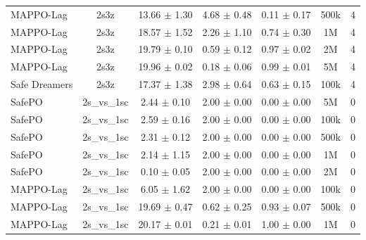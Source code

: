 \begin{longtable}{lcccccc}
MAPPO-Lag & 2s3z & \textcolor{green!60!black}{13.66 $\pm$ 1.30} & \textcolor{green!60!black}{4.68 $\pm$ 0.48} & \textcolor{green!60!black}{0.11 $\pm$ 0.17} & 500k & 4 \\
MAPPO-Lag & 2s3z & \textcolor{red!70!black}{18.57 $\pm$ 1.52} & \textcolor{red!70!black}{2.26 $\pm$ 1.10} & \textcolor{red!70!black}{0.74 $\pm$ 0.30} & 1M & 4 \\
MAPPO-Lag & 2s3z & \textcolor{red!70!black}{19.79 $\pm$ 0.10} & \textcolor{red!70!black}{0.59 $\pm$ 0.12} & \textcolor{red!70!black}{0.97 $\pm$ 0.02} & 2M & 4 \\
MAPPO-Lag & 2s3z & \textcolor{red!70!black}{19.96 $\pm$ 0.02} & \textcolor{red!70!black}{0.18 $\pm$ 0.06} & \textcolor{red!70!black}{0.99 $\pm$ 0.01} & 5M & 4 \\
Safe Dreamers & 2s3z & 17.37 $\pm$ 1.38 & 2.98 $\pm$ 0.64 & 0.63 $\pm$ 0.15 & 100k & 4 \\
\midrule
SafePO & 2s\_vs\_1sc & \textcolor{green!60!black}{2.44 $\pm$ 0.10} & \textcolor{green!60!black}{2.00 $\pm$ 0.00} & \textcolor{green!60!black}{0.00 $\pm$ 0.00} & 5M & 0 \\
SafePO & 2s\_vs\_1sc & \textcolor{green!60!black}{2.59 $\pm$ 0.16} & \textcolor{green!60!black}{2.00 $\pm$ 0.00} & \textcolor{green!60!black}{0.00 $\pm$ 0.00} & 100k & 0 \\
SafePO & 2s\_vs\_1sc & \textcolor{green!60!black}{2.31 $\pm$ 0.12} & \textcolor{green!60!black}{2.00 $\pm$ 0.00} & \textcolor{green!60!black}{0.00 $\pm$ 0.00} & 500k & 0 \\
SafePO & 2s\_vs\_1sc & \textcolor{green!60!black}{2.14 $\pm$ 1.15} & \textcolor{green!60!black}{2.00 $\pm$ 0.00} & \textcolor{green!60!black}{0.00 $\pm$ 0.00} & 1M & 0 \\
SafePO & 2s\_vs\_1sc & \textcolor{green!60!black}{0.10 $\pm$ 0.05} & \textcolor{green!60!black}{2.00 $\pm$ 0.00} & \textcolor{green!60!black}{0.00 $\pm$ 0.00} & 2M & 0 \\
MAPPO-Lag & 2s\_vs\_1sc & \textcolor{green!60!black}{6.05 $\pm$ 1.62} & \textcolor{green!60!black}{2.00 $\pm$ 0.00} & \textcolor{green!60!black}{0.00 $\pm$ 0.00} & 100k & 0 \\
MAPPO-Lag & 2s\_vs\_1sc & \textcolor{green!60!black}{19.69 $\pm$ 0.47} & \textcolor{green!60!black}{0.62 $\pm$ 0.25} & \textcolor{green!60!black}{0.93 $\pm$ 0.07} & 500k & 0 \\
MAPPO-Lag & 2s\_vs\_1sc & \textcolor{red!70!black}{20.17 $\pm$ 0.01} & \textcolor{red!70!black}{0.21 $\pm$ 0.01} & \textcolor{red!70!black}{1.00 $\pm$ 0.00} & 1M & 0 \\

\end{longtable}
